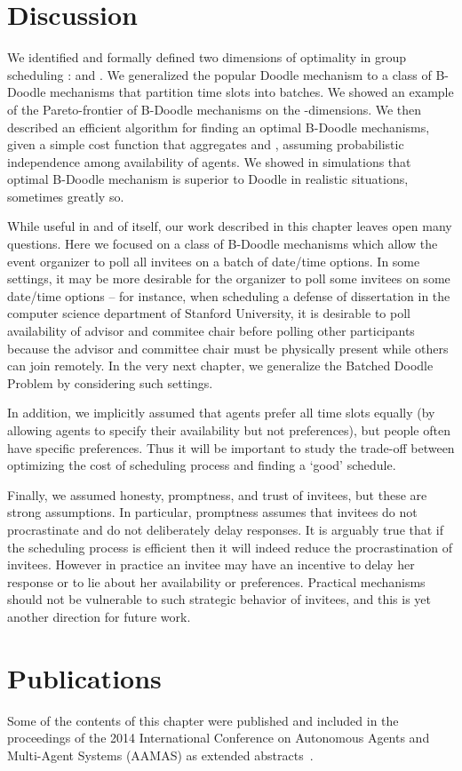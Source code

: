 \section{Discussion} \label{bdoodle:sec:Discussion}

We identified and formally defined two dimensions of optimality in
group scheduling : \Times and \Inconvenience. We generalized the popular
Doodle mechanism to a class of B-Doodle mechanisms that partition time
slots into batches. We showed an example of the Pareto-frontier of
B-Doodle mechanisms on the \Time-\Inconveniences dimensions. We then
described an efficient algorithm for finding an optimal B-Doodle
mechanisms, given a simple cost function that aggregates \Times and
\Inconvenience, assuming probabilistic independence among availability 
of agents. We showed in simulations that optimal B-Doodle mechanism 
is superior to Doodle in realistic situations, sometimes greatly so.

While useful in and of itself, our work described in this chapter leaves open many questions.
Here we focused on a class of B-Doodle mechanisms which allow the event organizer to poll all invitees on a batch of date/time options. In some settings, it may be more desirable for the organizer to poll some invitees on some date/time options -- for instance, when scheduling a defense of dissertation in the computer science department of Stanford University, it is desirable to poll availability of advisor and commitee chair before polling other participants because the advisor and committee chair must be physically present while others can join remotely. In the very next chapter, we generalize the Batched Doodle Problem by considering such settings. 

In addition, we implicitly assumed that agents prefer all time slots equally (by
allowing agents to specify their availability but not preferences),
but people often have specific preferences. Thus it will be important
to study the trade-off between optimizing the cost of scheduling
process and finding a `good' schedule.

Finally, we assumed honesty, promptness, and trust of invitees, but
these are strong assumptions. In particular, promptness assumes that
invitees do not procrastinate and do not deliberately delay responses.
It is arguably true that if the scheduling process is efficient then
it will indeed reduce the procrastination of invitees. However in
practice an invitee may have an incentive to delay her response or to
lie about her availability or preferences. Practical mechanisms should
not be vulnerable to such strategic behavior of invitees, and this is
yet another direction for future work.

\section*{Publications}
Some of the contents of this chapter were published and included in the proceedings of the 2014 International Conference on Autonomous Agents and Multi-Agent Systems (AAMAS) as extended abstracts~\cite{lee2014algorithmic,lee14doodle}.
